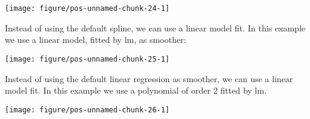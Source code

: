 \documentclass[paper=a4,10pt,div=17,headsepline,BCOR=12mm,twoside,open=right]{scrbook}\usepackage{knitr}
\begin{document}
\begin{knitrout}\footnotesize
{}\color{fgcolor}\begin{kframe}
\begin{alltt}
 \hlopt{+} \hlstd{(}\hlstd{=}\hlstd{)}
\end{alltt}
\end{kframe}

{\centering \texttt{[image: figure/pos-unnamed-chunk-24-1]} 

}



\end{knitrout}

Instead of using the default spline, we can use a linear model fit. In this example we use a linear model, fitted by lm, as smoother:

\begin{knitrout}\footnotesize
{}\color{fgcolor}\begin{kframe}
\begin{alltt}
 \hlopt{+} \hlstd{(}\hlstd{=}\hlstd{,} \hlstd{=}\hlstd{)}
\end{alltt}
\end{kframe}

{\centering \texttt{[image: figure/pos-unnamed-chunk-25-1]} 

}



\end{knitrout}

Instead of using the default linear regression as smoother, we can use a linear model fit. In this example we use a polynomial of order 2 fitted by lm.

\begin{knitrout}\footnotesize
{}\color{fgcolor}\begin{kframe}
\begin{alltt}
 \hlopt{+} \hlstd{(}\hlstd{=}\hlstd{,} \hlopt{~}\hlstd{),} \hlstd{=}\hlstd{)}
\end{alltt}
\end{kframe}

{\centering \texttt{[image: figure/pos-unnamed-chunk-26-1]} 

}



\end{knitrout}
\end{document}
